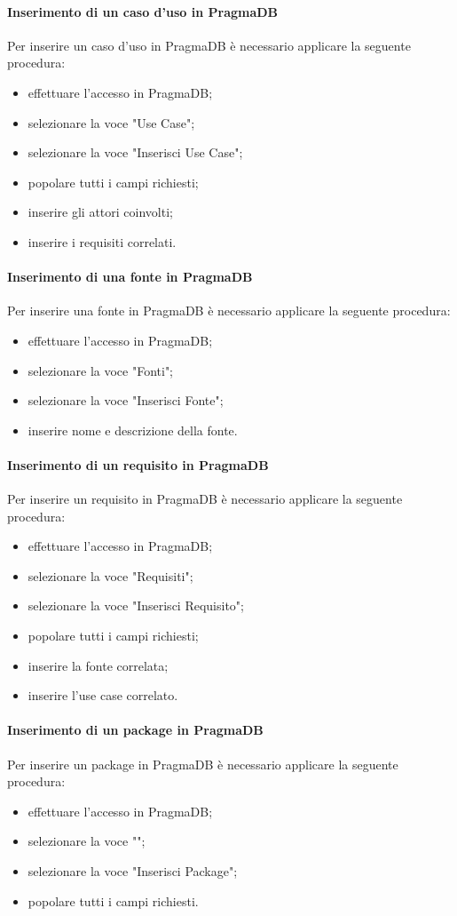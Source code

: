  \paragraph{Inserimento di un caso d'uso in PragmaDB}
 Per inserire un caso d'uso in PragmaDB è necessario applicare la seguente procedura:
 \begin{itemize}
 	\item effettuare l'accesso in PragmaDB;
 	\item selezionare la voce "Use Case";
 	\item selezionare la voce "Inserisci Use Case";
 	\item popolare tutti i campi richiesti;
 	\item inserire gli attori coinvolti;
 	\item inserire i requisiti correlati.
 \end{itemize}
 \paragraph{Inserimento di una fonte in PragmaDB}
 Per inserire una fonte in PragmaDB è necessario applicare la seguente procedura:
 \begin{itemize}
 	\item effettuare l'accesso in PragmaDB;
 	\item selezionare la voce "Fonti";
 	\item selezionare la voce "Inserisci Fonte";
 	\item inserire nome e descrizione della fonte.
 \end{itemize}
 \paragraph{Inserimento di un requisito in PragmaDB}
 Per inserire un requisito in PragmaDB è necessario applicare la seguente procedura:
 \begin{itemize}
 	\item effettuare l'accesso in PragmaDB;
 	\item selezionare la voce "Requisiti";
 	\item selezionare la voce "Inserisci Requisito";
 	\item popolare tutti i campi richiesti;
 	\item inserire la fonte correlata;
 	\item inserire l'use case correlato.
 \end{itemize}
 \paragraph{Inserimento di un package in PragmaDB}
 Per inserire un package in PragmaDB è necessario applicare la seguente procedura:
 \begin{itemize}
 	\item effettuare l'accesso in PragmaDB;
 	\item selezionare la voce "";
 	\item selezionare la voce "Inserisci Package";
 	\item popolare tutti i campi richiesti.
 \end{itemize}
